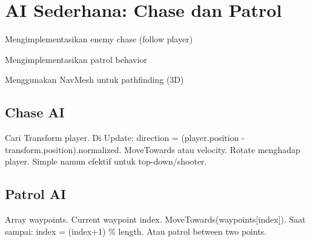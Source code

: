 \section{AI Sederhana: Chase dan Patrol}

\begin{learningoutcomes}
\item Mengimplementasikan enemy chase (follow player)
\item Mengimplementasikan patrol behavior
\item Menggunakan NavMesh untuk pathfinding (3D)
\end{learningoutcomes}

\subsection{Chase AI}

Cari Transform player. Di Update: direction = (player.position - transform.position).normalized. MoveTowards atau velocity. Rotate menghadap player. Simple namun efektif untuk top-down/shooter.

\subsection{Patrol AI}

Array waypoints. Current waypoint index. MoveTowards(waypoints[index]). Saat sampai: index = (index+1) \% length. Atau patrol between two points.
